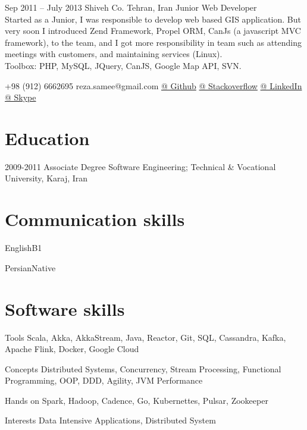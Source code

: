 \documentclass{tccv}
\begin{document}
\begin{eventlist}
\item{Sep 2011 -- July 2013}
  {Shiveh Co. Tehran, Iran}
  {Junior Web Developer}
  \\Started as a Junior, I was responsible to develop web based GIS application. But very soon I introduced Zend Framework, Propel ORM, CanJs (a javascript MVC framework), to the team, and I got more responsibility in team such as attending meetings with customers, and maintaining services (Linux).\\Toolbox: PHP, MySQL, JQuery, CanJS, Google Map API, SVN.

\end{eventlist}

  {+98 (912) 6662695}
  {reza.samee@gmail.com}
  {\href{https://github.com/sameei}{@ Github}}
  {\href{https://stackoverflow.com/users/998642/reza-sameei}{@ Stackoverflow}}
  {\href{http://linkedin.com/in/reza-sameei/}{@ LinkedIn}}
  {\href{https://join.skype.com/invite/nINGOAMPxZdX}{@ Skype}}

\section{Education}

\begin{yearlist}

\item{2009-2011}
  {Associate Degree}
  {Software Engineering; Technical \& Vocational University, Karaj, Iran}

\end{yearlist}


\section{Communication skills}

\begin{factlist}
  \item{English}{B1}
  \item{Persian}{Native}
\end{factlist}

\section{Software skills}

\begin{factlist}

\item{Tools}
  {Scala, Akka, AkkaStream, Java, Reactor, Git, SQL, Cassandra, Kafka, Apache Flink, Docker, Google Cloud}

\item{Concepts}
  {Distributed Systems, Concurrency, Stream Processing,
  Functional Programming, OOP, DDD, Agility, JVM Performance}

\item{Hands on}
  {Spark, Hadoop, Cadence, Go, Kubernettes, Pulsar, Zookeeper}

\item{Interests}
  {Data Intensive Applications, Distributed System}

\end{factlist}
\end{document}
